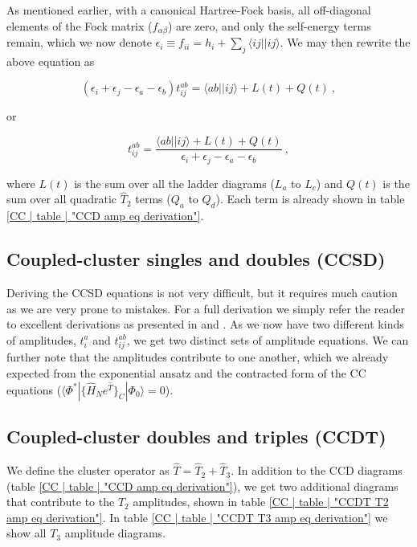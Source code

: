 \documentclass[10pt,twoside]{report}
\begin{document}
	As mentioned earlier, with a canonical Hartree-Fock basis, all off-diagonal elements of the Fock matrix ($f_{\alpha\beta}$) are zero, and only the self-energy terms remain, which we now denote $\epsilon_i \equiv f_{ii} = h_i + \sum_{j}\langle ij||ij\rangle$. We may then rewrite the above equation as
	
	\begin{equation}
		(\epsilon_i+\epsilon_j-\epsilon_a-\epsilon_b)t_{ij}^{ab} = \langle ab||ij\rangle + L(t) + Q(t) \:,
	\end{equation}
	
	\noindent or
	
	\begin{equation}
		t_{ij}^{ab} = \frac{\langle ab||ij\rangle + L(t) + Q(t)}{\epsilon_i+\epsilon_j-\epsilon_a-\epsilon_b} \:,
		\label{CC | eq | "CCD amplitudes equation"}
	\end{equation}
	
	\noindent where $L(t)$ is the sum over all the ladder diagrams ($L_a$ to $L_c$) and $Q(t)$ is the sum over all quadratic $\hat{T}_2$ terms ($Q_a$ to $Q_d$). Each term is already shown in table \ref{CC | table | "CCD amp eq derivation"}.
	
	\subsection{Coupled-cluster singles and doubles (CCSD)}
	Deriving the CCSD equations is not very difficult, but it requires much caution as we are very prone to mistakes. For a full derivation we simply refer the reader to excellent derivations as presented in \cite{ShavittBartlett09} and \cite{Hansen15}. As we now have two different kinds of amplitudes, $t_i^a$ and $t_{ij}^{ab}$, we get two distinct sets of amplitude equations. We can further note that the amplitudes contribute to one another, which we already expected from the exponential ansatz and the contracted form of the CC equations ($\langle\Phi^*|\{\hat{H}_Ne^{\hat{T}}\}_C|\Phi_0\rangle = 0$).
	
	\subsection{Coupled-cluster doubles and triples (CCDT)}
	We define the cluster operator as $\hat{T} = \hat{T}_2 + \hat{T}_3$. In addition to the CCD diagrams (table \ref{CC | table | "CCD amp eq derivation"}), we get two additional diagrams that contribute to the $T_2$ amplitudes, shown in table \ref{CC | table | "CCDT T2 amp eq derivation"}. In table \ref{CC | table | "CCDT T3 amp eq derivation"} we show all $T_3$ amplitude diagrams.
	
\end{document}
